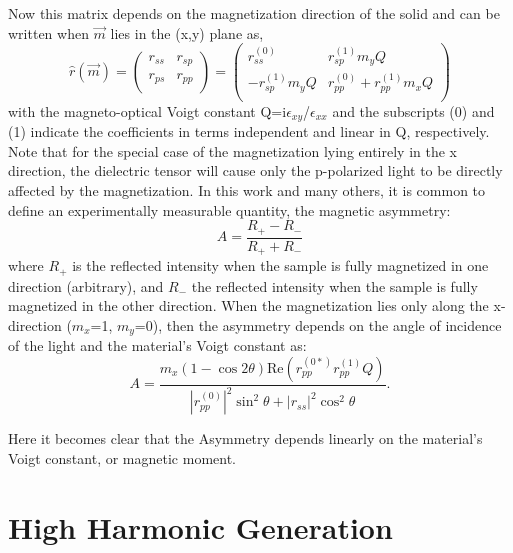 Now this matrix depends on the magnetization direction of the solid and can be written when $\vec{m}$ lies in the (x,y) plane as,
\begin{equation}
\hat{r}(\vec{m})= \left({\begin{array}{cc}
	r_{ss} & r_{sp} \\
	r_{ps} & r_{pp} \\ 
	\end{array} } \right) 
= \left({\begin{array}{cc}
	r_{ss}^{(0)} & r_{sp}^{(1)}m_y Q \\
	-r_{sp}^{(1)} m_y Q & r_{pp}^{(0)}+r_{pp}^{(1)}m_x Q \\ 
	\end{array} } \right)
\end{equation}
with the magneto-optical Voigt constant Q=i$\epsilon_{xy}$/$\epsilon_{xx}$ and the subscripts (0) and (1) indicate the coefficients in terms independent and linear in Q, respectively. Note that for the special case of the magnetization lying entirely in the x direction, the dielectric tensor will cause only the p-polarized light to be directly affected by the magnetization. In this work and many others, it is common to define an experimentally measurable quantity, the magnetic asymmetry:
\begin{equation}
A=\frac{R_+ - R_-}{R_+ + R_-}
\end{equation}
where $R_+$ is the reflected intensity when the sample is fully magnetized in one direction (arbitrary), and $R_-$ the reflected intensity when the sample is fully magnetized in the other direction. When the magnetization lies only along the x-direction ($m_x$=1, $m_y$=0), then the asymmetry depends on the angle of incidence of the light and the material's Voigt constant as:
\begin{equation}
A = \frac{m_x(1-\cos{2\theta})\text{Re}(r_{pp}^{(0*)}r_{pp}^{(1)}Q)}{|r_{pp}^{(0)}|^2\sin^2{\theta}+|r_{ss}|^2\cos^2{\theta}}.
\end{equation}

Here it becomes clear that the Asymmetry depends linearly on the material's Voigt constant, or magnetic moment.

\section{High Harmonic Generation}

